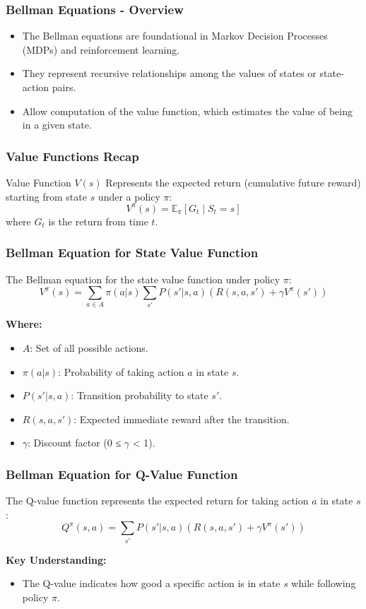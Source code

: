\documentclass[aspectratio=169]{beamer}
\begin{document}
\begin{frame}[fragile]
    \frametitle{Bellman Equations - Overview}
    \begin{itemize}
        \item The Bellman equations are foundational in Markov Decision Processes (MDPs) and reinforcement learning.
        \item They represent recursive relationships among the values of states or state-action pairs.
        \item Allow computation of the value function, which estimates the value of being in a given state.
    \end{itemize}
\end{frame}

\begin{frame}[fragile]
    \frametitle{Value Functions Recap}
    \begin{block}{Value Function \( V(s) \)}
        Represents the expected return (cumulative future reward) starting from state \( s \) under a policy \( \pi \):
        \[
            V^\pi(s) = \mathbb{E}_\pi \left[ G_t \mid S_t = s \right]
        \]
        where \( G_t \) is the return from time \( t \).
    \end{block}
\end{frame}

\begin{frame}[fragile]
    \frametitle{Bellman Equation for State Value Function}
    The Bellman equation for the state value function under policy \( \pi \):
    \[
        V^\pi(s) = \sum_{a \in A} \pi(a | s) \sum_{s'} P(s' | s, a) \left( R(s, a, s') + \gamma V^\pi(s') \right)
    \]

    \textbf{Where:}
    \begin{itemize}
        \item \( A \): Set of all possible actions.
        \item \( \pi(a | s) \): Probability of taking action \( a \) in state \( s \).
        \item \( P(s' | s, a) \): Transition probability to state \( s' \).
        \item \( R(s, a, s') \): Expected immediate reward after the transition.
        \item \( \gamma \): Discount factor (0 ≤ \( \gamma \) < 1).
    \end{itemize}
\end{frame}

\begin{frame}[fragile]
    \frametitle{Bellman Equation for Q-Value Function}
    The Q-value function represents the expected return for taking action \( a \) in state \( s \):
    \[
        Q^\pi(s, a) = \sum_{s'} P(s' | s, a) \left( R(s, a, s') + \gamma V^\pi(s') \right)
    \]

    \textbf{Key Understanding:}
    \begin{itemize}
        \item The Q-value indicates how good a specific action is in state \( s \) while following policy \( \pi \).
    \end{itemize}
\end{frame}
\end{document}
